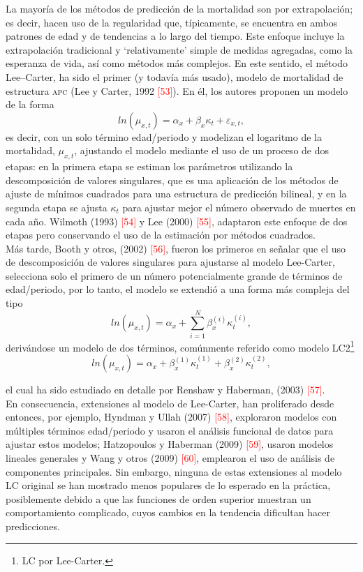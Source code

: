 La mayoría de los métodos de predicción de la mortalidad son por extrapolación; es decir, hacen uso de la regularidad que, típicamente, se encuentra en ambos patrones de edad y de tendencias a lo largo del tiempo. Este enfoque incluye la extrapolación tradicional y `relativamente' simple de medidas agregadas, como la esperanza de vida, así como métodos más complejos. En este sentido, el método Lee--Carter, ha sido el primer (y todavía más usado), modelo de mortalidad de estructura \textsc{apc} (Lee y Carter, 1992 \textcolor{red}{[53]}). En él, los autores proponen un modelo de la forma $$ln(\mu_{x,t})=\alpha_{x}+\beta_{x}\kappa_{t}+\varepsilon_{x,t},$$ es decir, con un solo término edad/periodo y modelizan el logaritmo de la mortalidad, $\mu_{x,t}$, ajustando el modelo mediante el uso de un proceso de dos etapas: en la primera etapa se estiman los parámetros utilizando la descomposición de valores singulares, que es una aplicación de los métodos de ajuste de mínimos cuadrados para una estructura de predicción bilineal, y en la segunda etapa se ajusta $\kappa_{t}$ para ajustar mejor el número observado de muertes en cada año. Wilmoth (1993) \textcolor{red}{[54]} y Lee (2000) \textcolor{red}{[55]}, adaptaron este enfoque de dos etapas pero conservando el uso de la estimación por métodos cuadrados.\\

Más tarde, Booth y otros, (2002) \textcolor{red}{[56]}, fueron los primeros en señalar que el uso de descomposición de valores singulares para ajustarse al modelo Lee-Carter, selecciona solo el primero de un número potencialmente grande de términos de edad/periodo, por lo tanto, el modelo se extendió a una forma más compleja del tipo $$ln(\mu_{x,t})=\alpha_{x}+\sum_{i=1}^{N}\beta_{x}^{(i)}\kappa_{t}^{(i)},$$ derivándose un modelo de dos términos, comúnmente referido como modelo LC2\footnote{LC por Lee-Carter.} 
$$ln(\mu_{x,t})=\alpha_{x}+\beta_{x}^{(1)}\kappa_{t}^{(1)}+\beta_{x}^{(2)}\kappa_{t}^{(2)},$$

\noindent el cual ha sido estudiado en detalle por Renshaw y Haberman, (2003) \textcolor{red}{[57]}.\\

En consecuencia, extensiones al modelo de Lee-Carter, han proliferado desde entonces, por ejemplo, Hyndman y Ullah (2007) \textcolor{red}{[58]}, exploraron modelos con múltiples términos edad/periodo y usaron el análisis funcional de datos para ajustar estos modelos; Hatzopoulos y Haberman (2009) \textcolor{red}{[59]}, usaron modelos lineales generales y Wang y otros (2009) \textcolor{red}{[60]}, emplearon el uso de análisis de componentes principales. Sin embargo, ninguna de estas extensiones al modelo LC original se han mostrado menos populares de lo esperado en la práctica, posiblemente debido a que las funciones de orden superior muestran un comportamiento complicado, cuyos cambios en la tendencia dificultan hacer predicciones.\\

